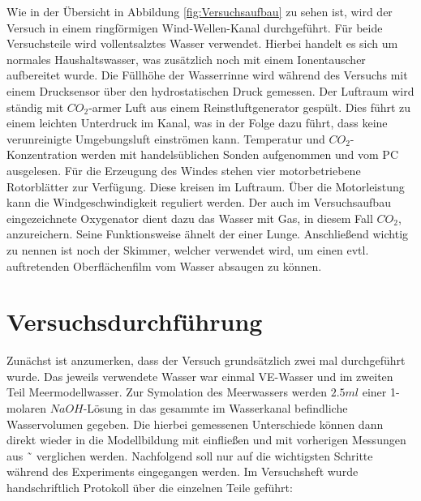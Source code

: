 \documentclass[12pt]{article}
\begin{document}
Wie in der Übersicht in Abbildung \ref{fig:Versuchsaufbau} zu sehen ist, wird der Versuch in einem ringförmigen Wind-Wellen-Kanal durchgeführt. Für beide Versuchsteile wird vollentsalztes Wasser verwendet. Hierbei handelt es sich um normales Haushaltswasser, was zusätzlich noch mit einem Ionentauscher aufbereitet wurde. Die Füllhöhe der Wasserrinne wird während des Versuchs mit einem Drucksensor über den hydrostatischen Druck gemessen. Der Luftraum wird ständig mit $CO_2$-armer Luft aus einem Reinstluftgenerator gespült. Dies führt zu einem leichten Unterdruck im Kanal, was in der Folge dazu führt, dass keine verunreinigte Umgebungsluft einströmen kann. Temperatur und $CO_2$-Konzentration werden mit handelsüblichen Sonden aufgenommen und vom PC ausgelesen. Für die Erzeugung des Windes stehen vier motorbetriebene Rotorblätter zur Verfügung. Diese kreisen im Luftraum. Über die Motorleistung kann die Windgeschwindigkeit reguliert werden. Der auch im Versuchsaufbau eingezeichnete Oxygenator dient dazu das Wasser mit Gas, in diesem Fall $CO_2$, anzureichern. Seine Funktionsweise ähnelt der einer Lunge. Anschließend wichtig zu nennen ist noch der Skimmer, welcher verwendet wird, um einen evtl. auftretenden Oberflächenfilm vom Wasser absaugen zu können.

\section{Versuchsdurchführung}

Zunächst ist anzumerken, dass der Versuch grundsätzlich zwei mal durchgeführt wurde. Das jeweils verwendete Wasser war einmal VE-Wasser und im zweiten Teil Meermodellwasser. Zur Symolation des Meerwassers werden $2.5ml$ einer 1-molaren $NaOH$-Lösung in das gesammte im Wasserkanal befindliche Wasservolumen gegeben. Die hierbei gemessenen Unterschiede können dann direkt wieder in die Modellbildung mit einfließen und mit vorherigen Messungen aus ˜\cite{jaehne} verglichen werden. 
Nachfolgend soll nur auf die wichtigsten Schritte während des Experiments eingegangen werden. Im Versuchsheft wurde handschriftlich Protokoll über die einzelnen Teile geführt:
\end{document}
